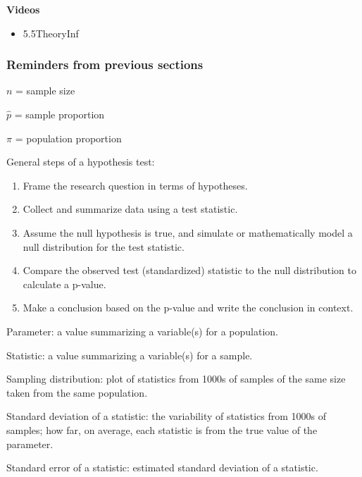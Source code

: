 \documentclass[
]{report}
\providecommand{\tightlist}{%
  \setlength{\itemsep}{0pt}\setlength{\parskip}{0pt}}
\begin{document}

\textbf{Videos}

\begin{itemize}
\tightlist
\item
  5.5TheoryInf
\end{itemize}


\hypertarget{reminders-from-previous-sections-4}{%
\subsubsection*{Reminders from previous sections}\label{reminders-from-previous-sections-4}}

\(n\) = sample size

\(\hat{p}\) = sample proportion

\(\pi\) = population proportion

General steps of a hypothesis test:

\begin{enumerate}
\def\labelenumi{\arabic{enumi}.}
\item
  Frame the research question in terms of hypotheses.
\item
  Collect and summarize data using a test statistic.
\item
  Assume the null hypothesis is true, and simulate or mathematically model a null distribution for the test statistic.
\item
  Compare the observed test (standardized) statistic to the null distribution to calculate a p-value.
\item
  Make a conclusion based on the p-value and write the conclusion in context.
\end{enumerate}

Parameter: a value summarizing a variable(s) for a population.

Statistic: a value summarizing a variable(s) for a sample.

Sampling distribution: plot of statistics from 1000s of samples of the same size taken from the same population.

Standard deviation of a statistic: the variability of statistics from 1000s of samples; how far, on average, each statistic is from the true value of the parameter.

Standard error of a statistic: estimated standard deviation of a statistic.
\end{document}
